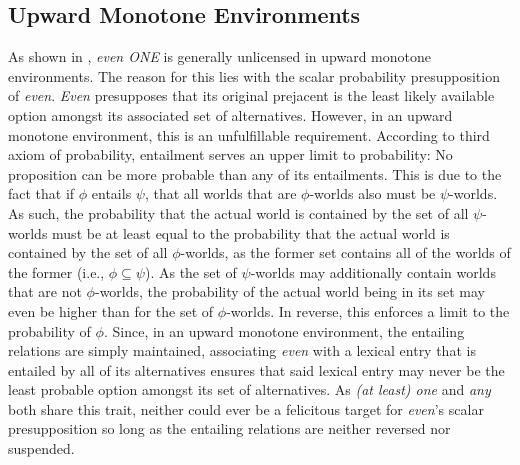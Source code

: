 \subsection{Upward Monotone Environments}
As shown in , \textit{even \MakeUppercase{one}} is generally unlicensed in upward monotone environments. The reason for this lies with the scalar probability presupposition of \textit{even}. \textit{Even} presupposes that its original prejacent is the least likely available option amongst its associated set of alternatives. However, in an upward monotone environment, this is an unfulfillable requirement. According to  third axiom of probability, entailment serves an upper limit to probability: No proposition can be more probable than any of its entailments.
\ex{}
{}
\xe
This is due to the fact that if $\phi$ entails $\psi$, that all worlds that are $\phi$-worlds also must be $\psi$-worlds. As such, the probability that the actual world is contained by the set of all $\psi$-worlds must be at least equal to the probability that the actual world is contained by the set of all $\phi$-worlds, as the former set contains all of the worlds of the former (i.e., $\phi\subseteq\psi$). As the set of $\psi$-worlds may additionally contain worlds that are not $\phi$-worlds, the probability of the actual world being in its set may even be higher than for the set of $\phi$-worlds. In reverse, this enforces a limit to the probability of $\phi$. Since, in an upward monotone environment, the entailing relations are simply maintained, associating \textit{even} with a lexical entry that is entailed by all of its alternatives ensures that said lexical entry may never be the least probable option amongst its set of alternatives. As \textit{(at least) one} and \textit{any} both share this trait, neither could ever be a felicitous target for \textit{even}'s scalar presupposition so long as the entailing relations are neither reversed nor suspended.

